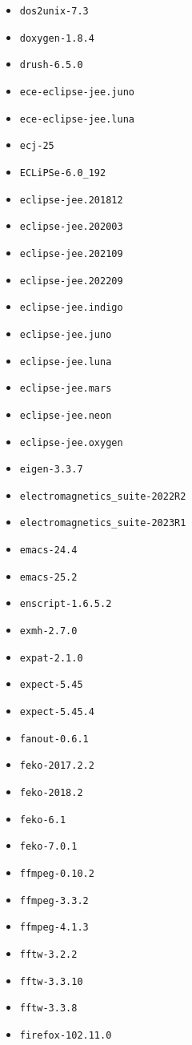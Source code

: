 \begin{multicols}{3}
\begin{itemize}
\item \verb|dos2unix-7.3|
\item \verb|doxygen-1.8.4|
\item \verb|drush-6.5.0|
\item \verb|ece-eclipse-jee.juno|
\item \verb|ece-eclipse-jee.luna|
\item \verb|ecj-25|
\item \verb|ECLiPSe-6.0_192|
\item \verb|eclipse-jee.201812|
\item \verb|eclipse-jee.202003|
\item \verb|eclipse-jee.202109|
\item \verb|eclipse-jee.202209|
\item \verb|eclipse-jee.indigo|
\item \verb|eclipse-jee.juno|
\item \verb|eclipse-jee.luna|
\item \verb|eclipse-jee.mars|
\item \verb|eclipse-jee.neon|
\item \verb|eclipse-jee.oxygen|
\item \verb|eigen-3.3.7|
\item \verb|electromagnetics_suite-2022R2|
\item \verb|electromagnetics_suite-2023R1|
\item \verb|emacs-24.4|
\item \verb|emacs-25.2|
\item \verb|enscript-1.6.5.2|
\item \verb|exmh-2.7.0|
\item \verb|expat-2.1.0|
\item \verb|expect-5.45|
\item \verb|expect-5.45.4|
\item \verb|fanout-0.6.1|
\item \verb|feko-2017.2.2|
\item \verb|feko-2018.2|
\item \verb|feko-6.1|
\item \verb|feko-7.0.1|
\item \verb|ffmpeg-0.10.2|
\item \verb|ffmpeg-3.3.2|
\item \verb|ffmpeg-4.1.3|
\item \verb|fftw-3.2.2|
\item \verb|fftw-3.3.10|
\item \verb|fftw-3.3.8|
\item \verb|firefox-102.11.0|

\end{itemize}
\end{multicols}
